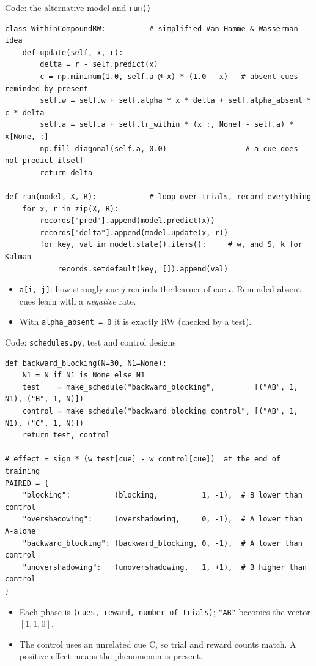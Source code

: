 \documentclass[aspectratio=169,11pt]{beamer}
\begin{document}
\begin{frame}[fragile]{Code: the alternative model and \texttt{run()}}
\begin{lstlisting}
class WithinCompoundRW:          # simplified Van Hamme & Wasserman idea
    def update(self, x, r):
        delta = r - self.predict(x)
        c = np.minimum(1.0, self.a @ x) * (1.0 - x)   # absent cues reminded by present
        self.w = self.w + self.alpha * x * delta + self.alpha_absent * c * delta
        self.a = self.a + self.lr_within * (x[:, None] - self.a) * x[None, :]
        np.fill_diagonal(self.a, 0.0)                  # a cue does not predict itself
        return delta

def run(model, X, R):            # loop over trials, record everything
    for x, r in zip(X, R):
        records["pred"].append(model.predict(x))
        records["delta"].append(model.update(x, r))
        for key, val in model.state().items():     # w, and S, k for Kalman
            records.setdefault(key, []).append(val)
\end{lstlisting}
\vspace{-0.2em}
\begin{itemize}\small
\item \texttt{a[i, j]}: how strongly cue $j$ reminds the learner of cue $i$. Reminded absent cues learn with a \emph{negative} rate.
\item With \texttt{alpha\_absent = 0} it is exactly RW (checked by a test).
\end{itemize}
\end{frame}

\begin{frame}[fragile]{Code: \texttt{schedules.py}, test and control designs}
\begin{lstlisting}
def backward_blocking(N=30, N1=None):
    N1 = N if N1 is None else N1
    test    = make_schedule("backward_blocking",         [("AB", 1, N1), ("B", 1, N)])
    control = make_schedule("backward_blocking_control", [("AB", 1, N1), ("C", 1, N)])
    return test, control

# effect = sign * (w_test[cue] - w_control[cue])  at the end of training
PAIRED = {
    "blocking":          (blocking,          1, -1),  # B lower than control
    "overshadowing":     (overshadowing,     0, -1),  # A lower than A-alone
    "backward_blocking": (backward_blocking, 0, -1),  # A lower than control
    "unovershadowing":   (unovershadowing,   1, +1),  # B higher than control
}
\end{lstlisting}
\vspace{0.4em}
\begin{itemize}\small
\item Each phase is \texttt{(cues, reward, number of trials)}; \texttt{"AB"} becomes the vector $[1, 1, 0]$.
\item The control uses an unrelated cue C, so trial and reward counts match. A positive effect means the phenomenon is present.
\end{itemize}
\end{frame}
\end{document}
